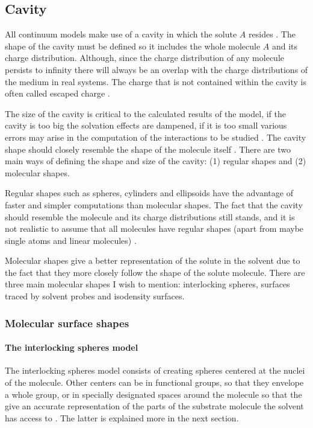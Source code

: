 \documentclass[../master_thesis.tex]{subfiles}
\begin{document}
\subsection{Cavity}\label{Cavitytitle}
All continuum models make use of a cavity in which the solute $A$ resides
\cite{Tomasi:1994wt, Cramer:2004, Tomasi:2005ipa}. The shape of the cavity
must be defined so it includes the whole molecule $A$ and its charge distribution.
Although, since the charge distribution of any molecule persists to infinity there
will always be an overlap with the charge distributions of the medium in real
systems. The charge that is not contained within the cavity is often called
escaped charge \cite{Tomasi:2005ipa}.

The size of the cavity is critical to the calculated results of the model, if
the cavity is too big the solvation effects are dampened, if it is too small
various errors may arise in the computation of the interactions to be studied
\cite{Tomasi:1994wt}. The cavity shape should closely
resemble the shape of the molecule itself \cite{Tomasi:2005ipa}. There are two
main ways of defining the shape and size of the cavity: (1) regular
shapes and (2) molecular shapes.

Regular shapes such as spheres, cylinders and ellipsoids have the advantage of
faster and simpler computations than molecular shapes. The fact that the cavity
should resemble the molecule and its charge distributions still stands, and it
is not realistic to assume that all molecules have regular shapes (apart from
maybe single atoms and linear molecules) \cite{Tomasi:2005ipa}.

Molecular shapes give a better representation of the solute in the solvent due
to the fact that they more closely follow the shape of the solute molecule.
There are three main molecular shapes I wish to mention:
interlocking spheres, surfaces traced by solvent probes and isodensity surfaces.

\subsubsection{Molecular surface shapes}

\paragraph{The interlocking spheres model}
The interlocking spheres model consists of creating spheres centered at the nuclei
of the molecule. Other centers can be in functional groups, so that they envelope a whole group,
or in specially designated spaces around the molecule so that the give an accurate
representation of the parts of the substrate molecule the solvent has access to
\cite{Tomasi:1994wt}. The latter is explained more in the next section.
\end{document}
